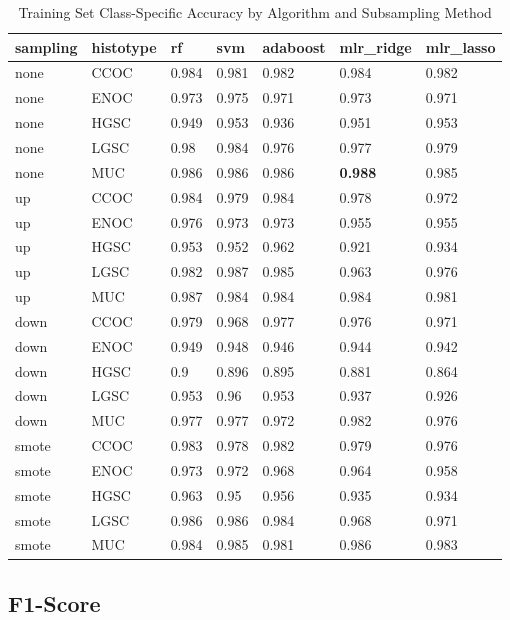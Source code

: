 \documentclass[
]{report}
\begin{document}
\begin{table}

\caption{\label{tab:train-accuracy-class-table}Training Set Class-Specific Accuracy by Algorithm and Subsampling Method}
\centering
\begin{tabular}[t]{l|l|l|l|l|l|l}
\hline
sampling & histotype & rf & svm & adaboost & mlr\_ridge & mlr\_lasso\\
\hline
none & CCOC & 0.984 & 0.981 & 0.982 & 0.984 & 0.982\\
\hline
none & ENOC & 0.973 & 0.975 & 0.971 & 0.973 & 0.971\\
\hline
none & HGSC & 0.949 & 0.953 & 0.936 & 0.951 & 0.953\\
\hline
none & LGSC & 0.98 & 0.984 & 0.976 & 0.977 & 0.979\\
\hline
none & MUC & 0.986 & 0.986 & 0.986 & \textbf{0.988} & 0.985\\
\hline
up & CCOC & 0.984 & 0.979 & 0.984 & 0.978 & 0.972\\
\hline
up & ENOC & 0.976 & 0.973 & 0.973 & 0.955 & 0.955\\
\hline
up & HGSC & 0.953 & 0.952 & 0.962 & 0.921 & 0.934\\
\hline
up & LGSC & 0.982 & 0.987 & 0.985 & 0.963 & 0.976\\
\hline
up & MUC & 0.987 & 0.984 & 0.984 & 0.984 & 0.981\\
\hline
down & CCOC & 0.979 & 0.968 & 0.977 & 0.976 & 0.971\\
\hline
down & ENOC & 0.949 & 0.948 & 0.946 & 0.944 & 0.942\\
\hline
down & HGSC & 0.9 & 0.896 & 0.895 & 0.881 & 0.864\\
\hline
down & LGSC & 0.953 & 0.96 & 0.953 & 0.937 & 0.926\\
\hline
down & MUC & 0.977 & 0.977 & 0.972 & 0.982 & 0.976\\
\hline
smote & CCOC & 0.983 & 0.978 & 0.982 & 0.979 & 0.976\\
\hline
smote & ENOC & 0.973 & 0.972 & 0.968 & 0.964 & 0.958\\
\hline
smote & HGSC & 0.963 & 0.95 & 0.956 & 0.935 & 0.934\\
\hline
smote & LGSC & 0.986 & 0.986 & 0.984 & 0.968 & 0.971\\
\hline
smote & MUC & 0.984 & 0.985 & 0.981 & 0.986 & 0.983\\
\hline
\end{tabular}
\end{table}

\hypertarget{f1-score}{%
\subsection{F1-Score}\label{f1-score}}
\end{document}
